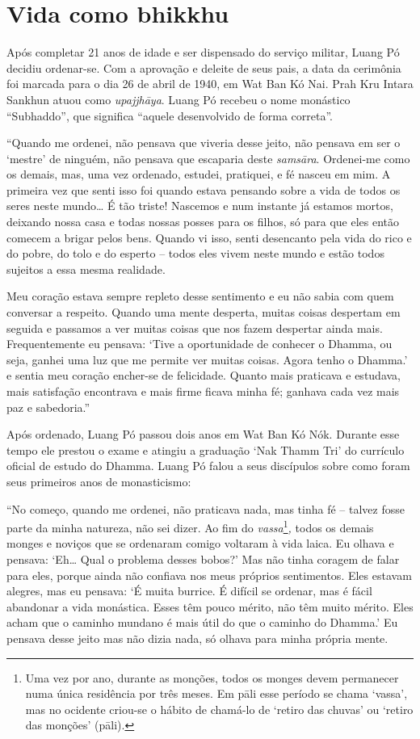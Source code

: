 \chapter{Vida como bhikkhu}

Após completar 21 anos de idade e ser dispensado do serviço militar,
Luang Pó decidiu ordenar-se. Com a aprovação e deleite de seus pais, a
data da cerimônia foi marcada para o dia 26 de abril de 1940, em Wat Ban
Kó Nai. Prah Kru Intara Sankhun atuou como \emph{upajjhāya}. Luang Pó
recebeu o nome monástico ``Subhaddo'', que significa ``aquele
desenvolvido de forma correta''.

``Quando me ordenei, não pensava que viveria desse jeito, não pensava em
ser o `mestre' de ninguém, não pensava que escaparia deste
\emph{samsāra}. Ordenei-me como os demais, mas, uma vez ordenado,
estudei, pratiquei, e fé nasceu em mim. A primeira vez que senti isso
foi quando estava pensando sobre a vida de todos os seres neste
mundo\ldots{} É tão triste! Nascemos e num instante já estamos mortos,
deixando nossa casa e todas nossas posses para os filhos, só para que
eles então comecem a brigar pelos bens. Quando vi isso, senti desencanto
pela vida do rico e do pobre, do tolo e do esperto -- todos eles vivem
neste mundo e estão todos sujeitos a essa mesma realidade.

Meu coração estava sempre repleto desse sentimento e eu não sabia com
quem conversar a respeito. Quando uma mente desperta, muitas coisas
despertam em seguida e passamos a ver muitas coisas que nos fazem
despertar ainda mais. Frequentemente eu pensava: `Tive a oportunidade de
conhecer o Dhamma, ou seja, ganhei uma luz que me permite ver muitas
coisas. Agora tenho o Dhamma.' e sentia meu coração encher-se de
felicidade. Quanto mais praticava e estudava, mais satisfação encontrava
e mais firme ficava minha fé; ganhava cada vez mais paz e sabedoria.''

Após ordenado, Luang Pó passou dois anos em Wat Ban Kó Nók. Durante esse
tempo ele prestou o exame e atingiu a graduação `Nak Thamm Tri' do
currículo oficial de estudo do Dhamma. Luang Pó falou a seus discípulos
sobre como foram seus primeiros anos de monasticismo:

``No começo, quando me ordenei, não praticava nada, mas tinha fé --
talvez fosse parte da minha natureza, não sei dizer. Ao fim do
\emph{vassa}\footnote{Uma vez por ano, durante as monções, todos os
  monges devem permanecer numa única residência por três meses. Em pāli
  esse período se chama `vassa', mas no ocidente criou-se o hábito de
  chamá-lo de `retiro das chuvas' ou `retiro das monções' (pāli).}\emph{,}
todos os demais monges e noviços que se ordenaram comigo voltaram à vida
laica. Eu olhava e pensava: `Eh\ldots{} Qual o problema desses bobos?'
Mas não tinha coragem de falar para eles, porque ainda não confiava nos
meus próprios sentimentos. Eles estavam alegres, mas eu pensava: `É
muita burrice. É difícil se ordenar, mas é fácil abandonar a vida
monástica. Esses têm pouco mérito, não têm muito mérito. Eles acham que
o caminho mundano é mais útil do que o caminho do Dhamma.' Eu pensava
desse jeito mas não dizia nada, só olhava para minha própria mente.

